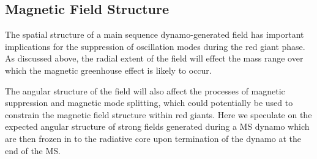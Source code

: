 \subsection{Magnetic Field Structure}
\label{fieldstruc}

The spatial structure of a main sequence dynamo-generated field has important implications for the suppression of oscillation modes during the red giant phase. As discussed above, the radial extent of the field will effect the mass range over which the magnetic greenhouse effect is likely to occur.

The angular structure of the field will also affect the processes of magnetic suppression and magnetic mode splitting, which could potentially be used to constrain the magnetic field structure within red giants. Here we speculate on the expected angular structure of strong fields generated during a MS dynamo which are then frozen in to the radiative core upon termination of the dynamo at the end of the MS.